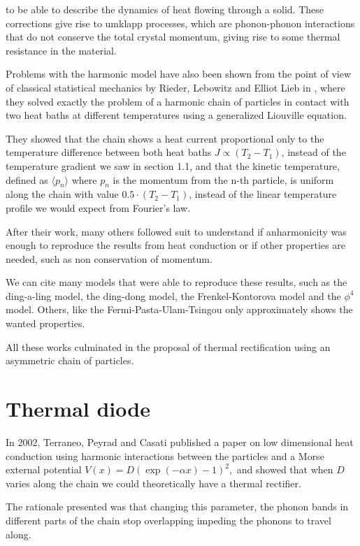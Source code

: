 to be able to describe the dynamics of heat flowing through a solid. These corrections give rise to umklapp processes, which are phonon-phonon interactions that do not conserve the total crystal momentum, giving rise to some thermal resistance in the material.

Problems with the harmonic model have also been shown from the point of view of classical statistical mechanics by Rieder, Lebowitz and Elliot Lieb in \cite{riederPropertiesHarmonic1967}, where they solved exactly the problem of a harmonic chain of particles in contact with two heat baths at different temperatures using a generalized Liouville equation.

They showed that the chain shows a heat current proportional only to the temperature difference between both heat baths $ J\propto (T_{2}-T_{1}) $, instead of the temperature gradient we saw in section 1.1, and that the kinetic temperature, defined as $ \langle p_{n} \rangle $ where $ p_{n} $ is the momentum from the n-th particle, is uniform along the chain with value $ 0.5\cdot(T_{2}-T_{1}) $, instead of the linear temperature profile we would expect from Fourier's law.

After their work, many others followed suit to understand if anharmonicity was enough to reproduce the results from heat conduction or if other properties are needed, such as non conservation of momentum. 

We can cite many models that were able to reproduce these results, such as the ding-a-ling model, the ding-dong model, the Frenkel-Kontorova model and the $ \phi^{4} $ model. Others, like the Fermi-Pasta-Ulam-Tsingou only approximately shows the wanted properties.

All these works culminated in the proposal of thermal rectification using an asymmetric chain of particles.

\section{Thermal diode}

In 2002, Terraneo, Peyrad and Casati \cite{terraneoControllingEnergy2002} published a paper on low dimensional heat conduction using harmonic interactions between the particles and a Morse external potential $ V(x) = D(\exp(-\alpha x)-1)^2, $ and showed that when $ D $ varies along the chain we could theoretically have a thermal rectifier.

The rationale presented was that changing this parameter, the phonon bands in different parts of the chain stop overlapping impeding the phonons to travel along. 

